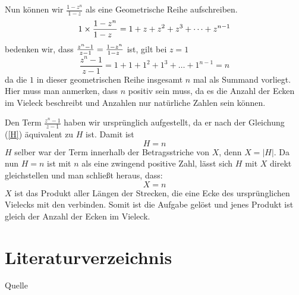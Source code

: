 \documentclass[a4paper,12pt]{article} %
\begin{document}
Nun können wir $\frac{1-z^n}{1-z}$ als eine Geometrische Reihe aufschreiben.
\[1\times\frac{1-z^n}{1-z\hspace{2mm}}=1+z+z^2+z^3+\dots+z^{n-1}\]
bedenken wir, dass $\frac{z^n-1}{z-1}=\frac{1-z^n}{1-z\hspace{1mm}}$ ist, gilt bei $z=1$
\[\frac{z^n-1}{z-1}=1+1+1^2+1^3+\dots+1^{n-1}=n\]
da die $1$ in dieser geometrischen Reihe insgesamt $n$ mal als Summand vorliegt.
Hier muss man anmerken, dass $n$ positiv sein muss, da es die Anzahl der Ecken im Vieleck beschreibt und Anzahlen nur natürliche Zahlen sein können.






Den Term $\frac{z^n-1}{z-1}$ haben wir ursprünglich aufgestellt, da er nach der Gleichung (\ref{H}) äquivalent zu $H$ ist. Damit ist
\[H=n\]
$H$ selber war der Term innerhalb der Betragsstriche von $X$, denn $X=|H|$.
Da nun $H=n$ ist mit $n$ als eine zwingend positive Zahl, lässt sich $H$ mit $X$ direkt gleichstellen und man schließt heraus, dass:
\[X=n\]
$X$ ist das Produkt aller Längen der Strecken, die eine Ecke des ursprünglichen Vielecks mit den verbinden. Somit ist die Aufgabe gelöst und jenes Produkt ist gleich der Anzahl der Ecken im Vieleck.







\section{Literaturverzeichnis}




\renewcommand{\refname}{Literaturverzeichnis}  %

\begin{thebibliography}{9}
	 Quelle
	
\end{thebibliography}
\end{document}
